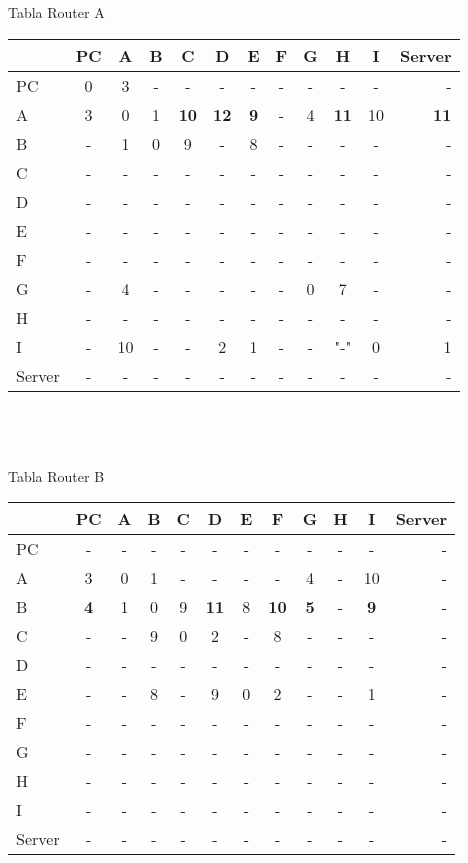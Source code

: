 \documentclass{article}
\begin{document}
\\
\\
Tabla Router A  \\
\begin{tabular}{l*{10}{c}r}
              & PC & A & B & C & D & E & F & G & H & I & Server \\
\hline
PC             & 0 & 3 & - & - & - & - & - & - & - & - & - \\
A              & 3 & 0 & 1 &\bf{10}&\bf{12}&\bf{9}& - & 4 &\bf{11}& 10 & \bf{11}\\
B              & - & 1 & 0 & 9 & - & 8 & - & - & - & - & -\\
C              & - & - & - & - & - & - & - & - & - & - & -\\
D              & - & - & - & - & - & - & - & - & - & - & -\\
E              & - & - & - & - & - & - & - & - & - & - & -\\
F              & - & - & - & - & - & - & - & - & - & - & -\\
G              & - & 4 & - & - & - & - & - & 0 & 7 & - & -\\
H              & - & - & - & - & - & - & - & - & - & - & -\\
I              & - & 10 & - & - & 2 & 1 & - & - & "-" & 0 & 1\\
Server         & - & - & - & - & - & - & - & - & - & - & -\\

\end{tabular}
\\\\
\\
Tabla Router B \\
\begin{tabular}{l*{10}{c}r}
              & PC & A & B & C & D & E & F & G & H & I & Server \\
\hline
PC             & - & - & - & - & - & - & - & - & - & - & -\\
A              & 3 & 0 & 1 & - & - & - & - & 4 & - & 10 & -\\
B              &\bf{4}& 1 & 0 & 9 &\bf{11}& 8 &\bf{10}&\bf{5}& - &\bf{9}& -\\
C              & - & - & 9 & 0 & 2 & - & 8 & - & - & - & -\\
D              & - & - & - & - & - & - & - & - & - & - & -\\
E              & - & - & 8 & - & 9 & 0 & 2 & - & - & 1 & -\\
F              & - & - & - & - & - & - & - & - & - & - & -\\
G              & - & - & - & - & - & - & - & - & - & - & -\\
H              & - & - & - & - & - & - & - & - & - & - & -\\
I              & - & - & - & - & - & - & - & - & - & - & -\\
Server         & - & - & - & - & - & - & - & - & - & - & -\\

\end{tabular}
\end{document}
